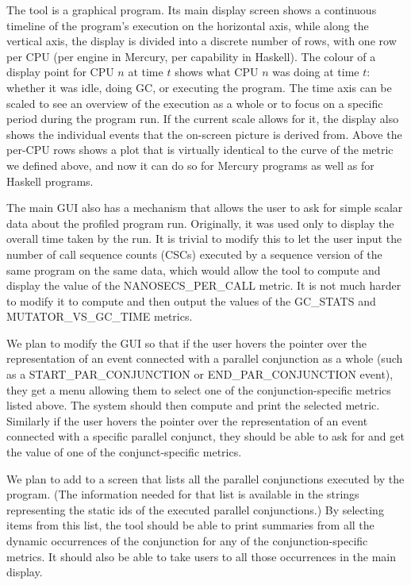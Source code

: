 The \tscope tool is a graphical program.
Its main display screen shows
a continuous timeline of the program's execution on the horizontal axis,
while along the vertical axis,
the display is divided into a discrete number of rows,
with one row per CPU (per engine in Mercury, per capability in Haskell).
The colour of a display point for CPU $n$ at time $t$
shows what CPU $n$ was doing at time $t$:
whether it was idle, doing GC, or executing the program.
The time axis can be scaled to see an overview of the execution as a whole
or to focus on a specific period during the program run.
If the current scale allows for it,
the display also shows the individual events
that the on-screen picture is derived from.
Above the per-CPU rows \tscope shows a plot that is virtually identical
to the curve of the  metric we defined above,
and now it can do so for Mercury programs as well as for Haskell programs.

The main \tscope GUI also has a mechanism that allows the user
to ask for simple scalar data about the profiled program run.
Originally, it was used only to display the overall time taken by the run.
It is trivial to modify this to let the user input
the number of call sequence counts (CSCs)
executed by a sequence version of the same program on the same data,
which would allow the tool to compute and display
the value of the NANOSECS\_PER\_CALL metric.
It is not much harder to modify it to compute and then output
the values of the GC\_STATS and MUTATOR\_VS\_GC\_TIME metrics.

We plan to modify the \tscope GUI so that
if the user hovers the pointer over the representation
of an event connected with a parallel conjunction as a whole
(such as a START\_PAR\_CONJUNCTION or END\_PAR\_CONJUNCTION event),
they get a menu allowing them to select
one of the conjunction-specific metrics listed above.
The system should then compute and print the selected metric.
Similarly if the user hovers the pointer over the representation
of an event connected with a specific parallel conjunct,
they should be able to ask for and get
the value of one of the conjunct-specific metrics.

We plan to add to \tscope a screen
that lists all the parallel conjunctions executed by the program.
(The information needed for that list is available in the strings
representing the static ids of the executed parallel conjunctions.)
By selecting items from this list,
the tool should be able to print summaries
from all the dynamic occurrences of the conjunction
for any of the conjunction-specific metrics.
It should also be able to take users
to all those occurrences in the main display.

